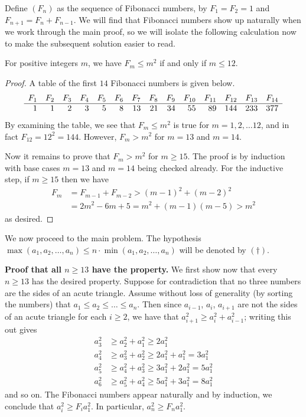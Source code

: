 \documentclass[11pt]{scrartcl}
\begin{document}
Define $(F_n)$ as the sequence of Fibonacci numbers,
by $F_1 = F_2 = 1$ and $F_{n+1} = F_n + F_{n-1}$.
We will find that Fibonacci numbers show up naturally
when we work through the main proof,
so we will isolate the following calculation now
to make the subsequent solution easier to read.
\begin{claim*}
  For positive integers $m$, we have $F_m \le m^2$ if and only if $m \le 12$.
\end{claim*}
\begin{proof}
  A table of the first $14$ Fibonacci numbers is given below.
  \[
    \begin{array}{rrrrr rrrrr rrrr}
      F_1 & F_2 & F_3 & F_4 & F_5 & F_6 & F_7 & F_8 & F_9
        & F_{10} & F_{11} & F_{12} & F_{13} & F_{14} \\ \hline
      1 & 1 & 2 & 3 & 5 & 8 & 13 & 21 & 34 & 55 & 89 & 144 & 233 & 377
    \end{array}
  \]
  By examining the table, we see that $F_m \le m^2$ is true for $m = 1, 2, \dots 12$,
  and in fact $F_{12} = 12^2 = 144$.
  However, $F_m > m^2$ for $m = 13$ and $m = 14$.

  Now it remains to prove that $F_m > m^2$ for $m \ge 15$.
  The proof is by induction with base cases
  $m = 13$ and $m = 14$ being checked already.
  For the inductive step, if $m \ge 15$ then we have
  \begin{align*}
    F_m &= F_{m-1} + F_{m-2} > (m-1)^2 + (m-2)^2 \\
    &= 2m^2 - 6m + 5 = m^2 + (m-1)(m-5) > m^2
  \end{align*}
  as desired.
\end{proof}

We now proceed to the main problem.
The hypothesis $\max(a_1,a_2,\dots,a_n)
\le n \cdot \min(a_1,a_2,\dots,a_n)$
will be denoted by $(\dagger)$.

\medskip

\textbf{Proof that all $n \ge 13$ have the property.}
We first show now that every $n \ge 13$ has the desired property.
Suppose for contradiction that no three numbers are the sides of an acute triangle.
Assume without loss of generality (by sorting the numbers)
that $a_1 \le a_2 \le \dots \le a_n$.
Then since $a_{i-1}$, $a_i$, $a_{i+1}$ are not the sides of an acute triangle
for each $i \ge 2$, we have that $a_{i+1}^2 \ge a_i^2 + a_{i-1}^2$;
writing this out gives
\begin{align*}
  a_3^2 &\ge a_2^2 + a_1^2 \ge 2a_1^2 \\
  a_4^2 &\ge a_3^2 + a_2^2 \ge 2a_1^2 + a_1^2 = 3a_1^2 \\
  a_5^2 &\ge a_4^2 + a_3^2 \ge 3a_1^2 + 2a_1^2 = 5a_1^2 \\
  a_6^2 &\ge a_5^2 + a_4^2 \ge 5a_1^2 + 3a_1^2 = 8a_1^2
\end{align*}
and so on.
The Fibonacci numbers appear naturally and by induction,
we conclude that $a_i^2 \ge F_i a_1^2$.
In particular, $a_n^2 \ge F_n a_1^2$.
\end{document}
